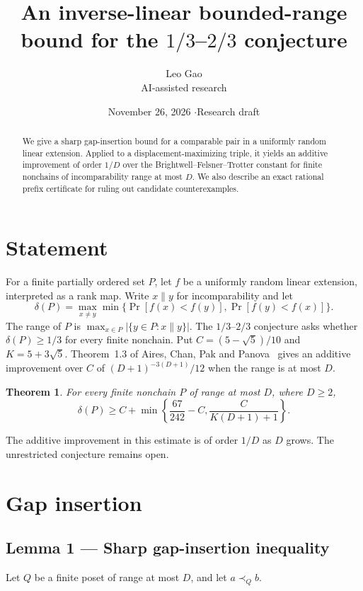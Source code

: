 \documentclass[11pt]{article}
\title{An inverse-linear bounded-range bound for the $1/3$--$2/3$ conjecture}
\author{Leo Gao\\[-1pt]{\small AI-assisted research}}
\date{November 26, 2026 \quad$\cdot$\quad Research draft}
\newtheorem{theorem}{Theorem}
\begin{document}
\maketitle
\begin{abstract}
We give a sharp gap-insertion bound for a comparable pair in a uniformly random linear extension. Applied to a displacement-maximizing triple, it yields an additive improvement of order $1/D$ over the Brightwell--Felsner--Trotter constant for finite nonchains of incomparability range at most $D$. We also describe an exact rational prefix certificate for ruling out candidate counterexamples.
\end{abstract}

\section{Statement}

For a finite partially ordered set $P$, let $f$ be a uniformly random linear extension, interpreted as a rank map. Write $x\parallel y$ for incomparability and let
\[
 \delta(P)=\max_{x\ne y}\min\{\Pr[f(x)<f(y)],\Pr[f(y)<f(x)]\}.
\]
The range of $P$ is $\max_{x\in P}|\{y\in P:x\parallel y\}|$. The $1/3$--$2/3$ conjecture asks whether $\delta(P)\ge 1/3$ for every finite nonchain. Put $C=(5-\sqrt5)/10$ and $K=5+3\sqrt5$. Theorem~1.3 of Aires, Chan, Pak and Panova~\cite{ACPP} gives an additive improvement over $C$ of $(D+1)^{-3(D+1)}/12$ when the range is at most $D$.

\begin{theorem}
For every finite nonchain $P$ of range at most $D$, where $D\ge2$,
\[
\delta(P)\ge C+\min\left\{\frac{67}{242}-C,\frac{C}{K(D+1)+1}\right\}.
\]
\end{theorem}

The additive improvement in this estimate is of order $1/D$ as $D$ grows. The unrestricted conjecture remains open.

\section{Gap insertion}

\subsection{Lemma 1 --- Sharp gap-insertion inequality}

Let \(Q\) be a finite poset of range at most \(D\), and let \(a\prec_Q b\).
\end{document}
